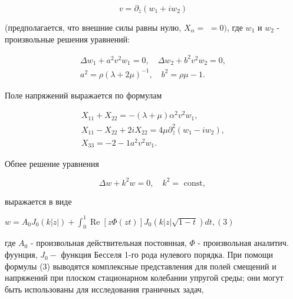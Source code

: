 \documentclass[10pt]{article}
\begin{document}
\[

v=\partial_{\bar{z}}\left(w_{1}+i w_{2}\right)

\]



(предполагается, что внешние силы равны нулю, $X_{\alpha}=$ $=0)$, где $w_{1}$ и $w_{2}$ - произвольные решения уравнений:



\[

\begin{gathered}

\Delta w_{1}+a^{2} v^{2} w_{1}=0, \quad \Delta w_{2}+b^{2} v^{2} w_{2}=0, \\

a^{2}=\rho(\lambda+2 \mu)^{-1}, \quad b^{2}=\rho \mu-1 .

\end{gathered}

\]



Поле напряжений выражается по формулам



\[

\begin{gathered}

X_{11}+X_{22}=-(\lambda+\mu) \alpha^{2} v^{2} w_{1}, \\

X_{11}-X_{22}+2 i X_{22}=4 \mu \partial_{\bar{z}}^{2}\left(w_{1}-i w_{2}\right), \\

X_{33}=-2-1 a^{2} v^{2} w_{1} .

\end{gathered}

\]



Обпее решение уравнения



\[

\Delta w+k^{2} w=0, \quad k^{2}=\text { const, }

\]



выражается в виде



$w=A_{0} J_{0}(k|z|)+\int_{0}^{1} \operatorname{Re}[z \Phi(z t)] J_{0}(k|z| \sqrt{1-t}) d t,(3)$



где $A_{0}$ - произвольная действительная постоянная, $\Phi$ - произвольная аналитич. фуунция, $J_{0}-$ функция Бесселя 1-го рода нулевого порядка. При помощи формулы (3) выводятся комплексные представления для полей смещений и напряжений при плоском стационарном колебании упругой среды; они могут быть использованы для исследования граничных задач,
\end{document}
